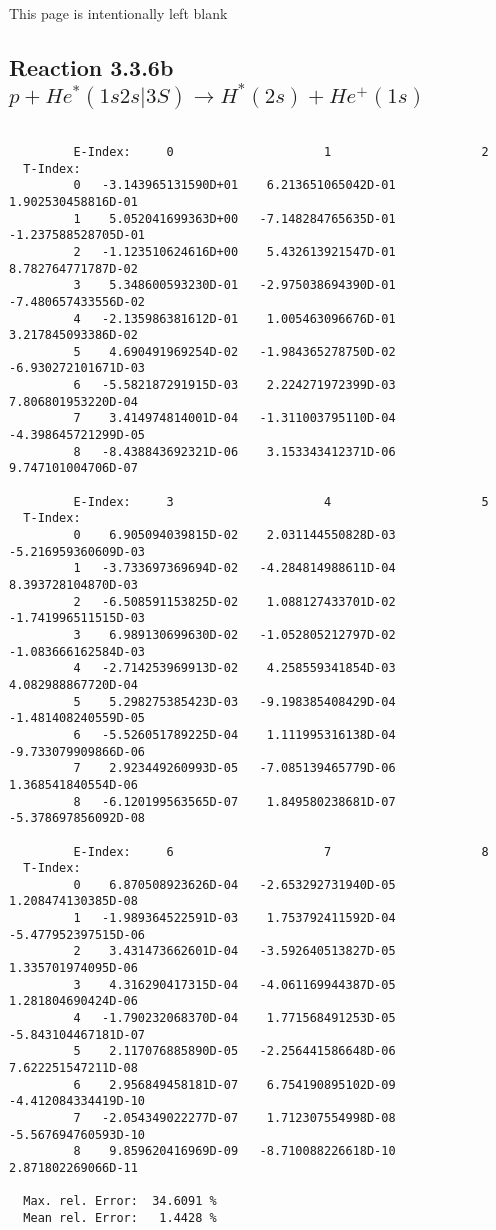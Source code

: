 \newpage
This page is intentionally left blank
\newpage

\subsection{
Reaction 3.3.6b   $p + He^*(1s2s|3S) \rightarrow H^*(2s) + He^+(1s) $
}

\begin{verbatim}

         E-Index:     0                     1                     2
  T-Index:
         0   -3.143965131590D+01    6.213651065042D-01    1.902530458816D-01
         1    5.052041699363D+00   -7.148284765635D-01   -1.237588528705D-01
         2   -1.123510624616D+00    5.432613921547D-01    8.782764771787D-02
         3    5.348600593230D-01   -2.975038694390D-01   -7.480657433556D-02
         4   -2.135986381612D-01    1.005463096676D-01    3.217845093386D-02
         5    4.690491969254D-02   -1.984365278750D-02   -6.930272101671D-03
         6   -5.582187291915D-03    2.224271972399D-03    7.806801953220D-04
         7    3.414974814001D-04   -1.311003795110D-04   -4.398645721299D-05
         8   -8.438843692321D-06    3.153343412371D-06    9.747101004706D-07

         E-Index:     3                     4                     5
  T-Index:
         0    6.905094039815D-02    2.031144550828D-03   -5.216959360609D-03
         1   -3.733697369694D-02   -4.284814988611D-04    8.393728104870D-03
         2   -6.508591153825D-02    1.088127433701D-02   -1.741996511515D-03
         3    6.989130699630D-02   -1.052805212797D-02   -1.083666162584D-03
         4   -2.714253969913D-02    4.258559341854D-03    4.082988867720D-04
         5    5.298275385423D-03   -9.198385408429D-04   -1.481408240559D-05
         6   -5.526051789225D-04    1.111995316138D-04   -9.733079909866D-06
         7    2.923449260993D-05   -7.085139465779D-06    1.368541840554D-06
         8   -6.120199563565D-07    1.849580238681D-07   -5.378697856092D-08

         E-Index:     6                     7                     8
  T-Index:
         0    6.870508923626D-04   -2.653292731940D-05    1.208474130385D-08
         1   -1.989364522591D-03    1.753792411592D-04   -5.477952397515D-06
         2    3.431473662601D-04   -3.592640513827D-05    1.335701974095D-06
         3    4.316290417315D-04   -4.061169944387D-05    1.281804690424D-06
         4   -1.790232068370D-04    1.771568491253D-05   -5.843104467181D-07
         5    2.117076885890D-05   -2.256441586648D-06    7.622251547211D-08
         6    2.956849458181D-07    6.754190895102D-09   -4.412084334419D-10
         7   -2.054349022277D-07    1.712307554998D-08   -5.567694760593D-10
         8    9.859620416969D-09   -8.710088226618D-10    2.871802269066D-11

  Max. rel. Error:  34.6091 %
  Mean rel. Error:   1.4428 %
\end{verbatim}


